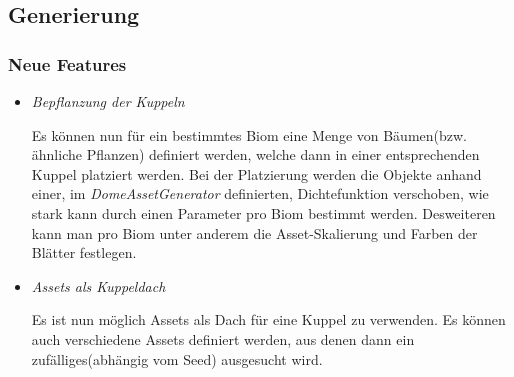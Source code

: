 \subsection{Generierung}

\subsubsection{Neue Features}
\begin{itemize}
    \item \textit{Bepflanzung der Kuppeln}
        \begin{leftbar}[0.9\linewidth]
            Es können nun für ein bestimmtes Biom eine Menge von Bäumen(bzw. ähnliche Pflanzen) definiert werden,
            welche dann in einer entsprechenden Kuppel platziert werden. Bei der Platzierung werden die Objekte
            anhand einer, im \textit{DomeAssetGenerator} definierten, Dichtefunktion verschoben, wie stark 
            kann durch einen Parameter pro Biom bestimmt werden.
            Desweiteren kann man pro Biom unter anderem die Asset-Skalierung und Farben der Blätter festlegen.
        \end{leftbar}

    \item \textit{Assets als Kuppeldach}
        \begin{leftbar}[0.9\linewidth]
            Es ist nun möglich Assets als Dach für eine Kuppel zu verwenden. Es können auch verschiedene Assets
            definiert werden, aus denen dann ein zufälliges(abhängig vom Seed) ausgesucht wird.
        \end{leftbar}
\end{itemize}

